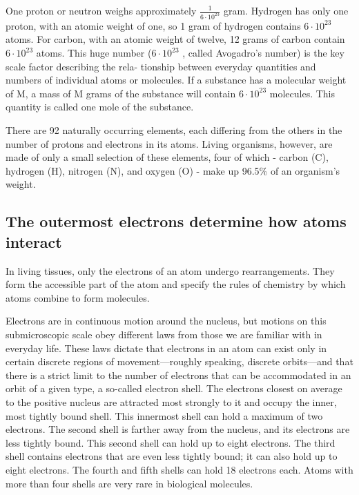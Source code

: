 One proton or neutron weighs approximately $\frac{1}{6 \cdot 10^23}$ gram. Hydrogen has
only one proton, with an atomic weight of one, so 1 gram of hydrogen
contains $6 \cdot 10^23$ atoms. For carbon, with an atomic weight of twelve,
12 grams of carbon contain $6 \cdot 10^23$ atoms. This huge number ($6 \cdot 10^23$ ,
called Avogadro’s number) is the key scale factor describing the rela-
tionship between everyday quantities and numbers of individual atoms
or molecules. If a substance has a molecular weight of M, a mass of M
grams of the substance will contain $6 \cdot 10^23$ molecules. This quantity is
called one mole of the substance.

There are 92 naturally occurring elements, each differing from the others
in the number of protons and electrons in its atoms. Living organisms,
however, are made of only a small selection of these elements, four of
which - carbon (C), hydrogen (H), nitrogen (N), and oxygen (O) - make up
96.5\% of an organism’s weight.


\subsection{The outermost electrons determine how atoms interact}

In living tissues, only the electrons of an atom undergo rearrangements.
They form the accessible part of the atom and specify the rules of 
chemistry by which atoms combine to form molecules.

Electrons are in continuous motion around the nucleus, but motions on
this submicroscopic scale obey different laws from those we are familiar
with in everyday life. These laws dictate that electrons in an atom can exist
only in certain discrete regions of movement—roughly speaking, discrete
orbits—and that there is a strict limit to the number of electrons that can
be accommodated in an orbit of a given type, a so-called electron shell.
The electrons closest on average to the positive nucleus are attracted
most strongly to it and occupy the inner, most tightly bound shell. This
innermost shell can hold a maximum of two electrons. The second shell
is farther away from the nucleus, and its electrons are less tightly bound.
This second shell can hold up to eight electrons. The third shell contains
electrons that are even less tightly bound; it can also hold up to eight
electrons. The fourth and fifth shells can hold 18 electrons each. Atoms
with more than four shells are very rare in biological molecules.


